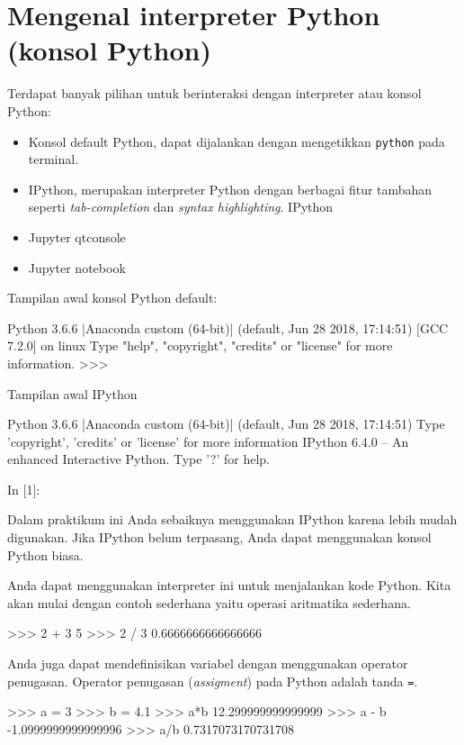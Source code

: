 \section{Mengenal interpreter Python (konsol Python)}

Terdapat banyak pilihan untuk berinteraksi dengan interpreter 
atau konsol Python:
\begin{itemize}
\item Konsol default Python, dapat dijalankan dengan mengetikkan
\texttt{python} pada terminal.
\item IPython, merupakan interpreter Python dengan berbagai fitur tambahan
seperti \textit{tab-completion} dan \textit{syntax highlighting}.
IPython 
\item Jupyter qtconsole
\item Jupyter notebook
\end{itemize}

Tampilan awal konsol Python default:
\begin{textcode}
Python 3.6.6 |Anaconda custom (64-bit)| (default, Jun 28 2018, 17:14:51) 
[GCC 7.2.0] on linux
Type "help", "copyright", "credits" or "license" for more information.
>>>
\end{textcode}

Tampilan awal IPython
\begin{textcode}
Python 3.6.6 |Anaconda custom (64-bit)| (default, Jun 28 2018, 17:14:51) 
Type 'copyright', 'credits' or 'license' for more information
IPython 6.4.0 -- An enhanced Interactive Python. Type '?' for help.

In [1]:
\end{textcode}

Dalam praktikum ini Anda sebaiknya menggunakan IPython karena lebih
mudah digunakan. Jika IPython belum terpasang, Anda dapat menggunakan
konsol Python biasa.

Anda dapat menggunakan interpreter ini untuk menjalankan kode Python.
Kita akan mulai dengan contoh sederhana yaitu operasi aritmatika
sederhana.
\begin{pyconcode}
>>> 2 + 3
5
>>> 2 / 3
0.6666666666666666
\end{pyconcode}

Anda juga dapat mendefinisikan variabel dengan menggunakan operator
penugasan. Operator penugasan (\textit{assigment})
pada Python adalah tanda \texttt{=}.

\begin{pyconcode}
>>> a = 3
>>> b = 4.1
>>> a*b
12.299999999999999
>>> a - b
-1.0999999999999996
>>> a/b
0.7317073170731708
\end{pyconcode}

